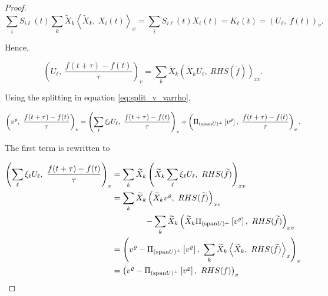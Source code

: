 \begin{proof}
    \begin{equation}
        \sum_i S_{i \ell} (t) \sum_k 
            \widetilde{ X }_k \left\langle \widetilde{ X }_k,\ X_i (t) \right\rangle_x
        = \sum_i S_{i \ell} (t) X_i (t) 
        = K_\ell (t) 
        = \left( U_\ell,\ f(t) \right)_v . 
    \end{equation}

    Hence, 

    \begin{equation}
        \left( U_\ell,\ \frac{f(t + \tau) - f(t)}{\tau} \right)_v
        = \sum_k \widetilde{ X }_k 
        \left( \widetilde{ X }_k U_\ell,\ RHS (\widetilde{ f }) \right)_{x v} . 
    \end{equation}

    Using the splitting in equation \ref{eq:split_v_varrho}, 

    \begin{equation}\label{eq:continuity_finite_diff_part}
        \left( v^\varrho,\ \frac{f(t + \tau) - f(t)}{\tau} \right)_v
        = \left( \sum_\ell \xi_\ell U_\ell,\ \frac{f(t + \tau) - f(t)}{\tau} \right)_v
            + \left( \Pi_{(\spn U)^\perp} \left[ v^\varrho \right],\ 
            \frac{f(t + \tau) - f(t)}{\tau} \right)_v . 
    \end{equation}

    The first term is rewritten to 

    \begin{equation}\label{eq:continuity_U_part}
        \begin{split}
            \left( \sum_\ell \xi_\ell U_\ell,\ \frac{f(t + \tau) - f(t)}{\tau} \right)_v
            &= \sum_k \widetilde{ X }_k \left( 
                \widetilde{ X }_k \sum_\ell \xi_\ell U_\ell,\ 
                RHS(\widetilde{ f }) 
            \right)_{x v} \\ 
            &= \sum_k \widetilde{ X }_k 
                \left( \widetilde{ X }_k v^\varrho,\ RHS (\widetilde{ f }) \right)_{x v} \\
                &\quad\quad\quad\quad
                - \sum_k \widetilde{ X }_k \left( \widetilde{ X }_k \Pi_{(\spn U)^\perp} \left[ v^\varrho \right],\ 
                RHS( \widetilde{ f } ) \right)_{x v} \\ 
            &= \left( 
                v^\varrho - \Pi_{(\spn U)^\perp} \left[ v^\varrho \right],\ 
                \sum_k \widetilde{ X }_k \left\langle \widetilde{ X }_k,\ RHS(\widetilde{ f }) \right\rangle_x
             \right)_v \\ 
            &= \left( v^\varrho - \Pi_{(\spn U)^\perp} \left[ v^\varrho \right],\ RHS(f) \right)_v 
        \end{split}
    \end{equation}


\end{proof}
